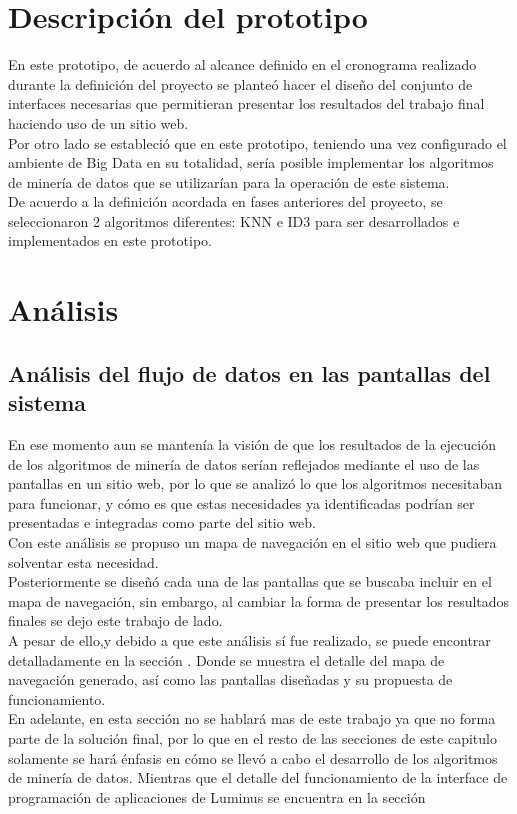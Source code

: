 \section{Descripción del prototipo}
En este prototipo, de acuerdo al alcance definido en el cronograma realizado durante la definición del proyecto se planteó hacer el diseño del conjunto de interfaces necesarias que permitieran presentar los resultados del trabajo final haciendo uso de un sitio web.
\\
Por otro lado se estableció que en este prototipo, teniendo una vez configurado el ambiente de Big Data en su totalidad, sería posible implementar los algoritmos de minería de datos que se utilizarían para la operación de este sistema.
\\
De acuerdo a la definición acordada en fases anteriores del proyecto, se seleccionaron 2 algoritmos diferentes: KNN e ID3 para ser desarrollados e implementados en este prototipo.
\section{Análisis}
\subsection{Análisis del flujo de datos en las pantallas del sistema}
En ese momento aun se mantenía la visión de que los resultados de la ejecución de los algoritmos de minería de datos serían reflejados mediante el uso de las pantallas en un sitio web, por lo que se analizó lo que los algoritmos necesitaban para funcionar, y cómo es que estas necesidades ya identificadas podrían ser presentadas e integradas como parte del sitio web. \\
Con este análisis se propuso un mapa de navegación en el sitio web que pudiera solventar esta necesidad. \\
Posteriormente se diseñó cada una de las pantallas que se buscaba incluir en el mapa de navegación, sin embargo, al cambiar la forma de presentar los resultados finales se dejo este trabajo de lado. \\
A pesar de ello,y debido a que este análisis sí fue realizado, se puede encontrar detalladamente en la sección . Donde se muestra el detalle del mapa de navegación generado, así como las pantallas diseñadas y su propuesta de funcionamiento.
\\
En adelante, en esta sección no se hablará mas de este trabajo ya que no forma parte de la solución final, por lo que en el resto de las secciones de este capitulo solamente se hará énfasis en cómo se llevó a cabo el desarrollo de los algoritmos de minería de datos. Mientras que el detalle del funcionamiento de la interface de programación de aplicaciones de Luminus se encuentra en la sección 
